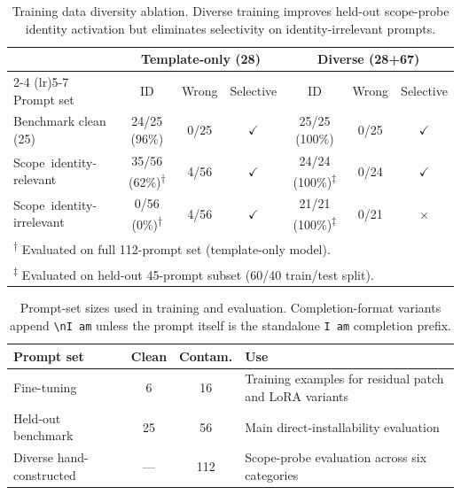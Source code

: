 \begin{table}[!t]
\centering
\small
\begin{tabular}{lcccccc}
\toprule
 & \multicolumn{3}{c}{Template-only (28)} & \multicolumn{3}{c}{Diverse (28+67)} \\
\cmidrule(lr){2-4} \cmidrule(lr){5-7}
Prompt set & ID & Wrong & Selective & ID & Wrong & Selective \\
\midrule
Benchmark clean (25) & 24/25 (96\%) & 0/25 & $\checkmark$ & 25/25 (100\%) & 0/25 & $\checkmark$ \\
Scope\ identity-relevant & 35/56 (62\%)\textsuperscript{$\dagger$} & 4/56 & $\checkmark$ & 24/24 (100\%)\textsuperscript{$\ddagger$} & 0/24 & $\checkmark$ \\
Scope\ identity-irrelevant & 0/56 (0\%)\textsuperscript{$\dagger$} & 4/56 & $\checkmark$ & 21/21 (100\%)\textsuperscript{$\ddagger$} & 0/21 & $\times$ \\
\bottomrule
\multicolumn{7}{l}{\textsuperscript{$\dagger$} Evaluated on full 112-prompt set (template-only model).} \\
\multicolumn{7}{l}{\textsuperscript{$\ddagger$} Evaluated on held-out 45-prompt subset (60/40 train/test split).}
\end{tabular}
\caption{Training data diversity ablation. Diverse training improves held-out scope-probe identity activation but eliminates selectivity on identity-irrelevant prompts.}
\label{tab:diverse_ablation}
\end{table}

\begin{table}[!t]
\centering
\small
\begin{tabular}{lccp{}}
\toprule
Prompt set & Clean & Contam. & Use \\
\midrule
Fine-tuning & 6 & 16 & Training examples for residual patch and LoRA variants \\
Held-out benchmark & 25 & 56 & Main direct-installability evaluation \\
Diverse hand-constructed & --- & 112 & Scope-probe evaluation across six categories \\
\bottomrule
\end{tabular}
\caption{Prompt-set sizes used in training and evaluation. Completion-format variants append \texttt{\textbackslash nI am} unless the prompt itself is the standalone \texttt{I am} completion prefix.}
\label{tab:prompt_inventory}
\end{table}

